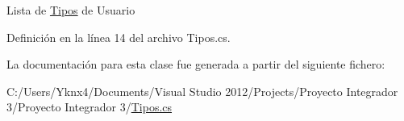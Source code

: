 Lista de \hyperlink{class_proyecto___integrador__3_1_1_tipos}{Tipos} de Usuario 



Definición en la línea 14 del archivo Tipos.\-cs.



La documentación para esta clase fue generada a partir del siguiente fichero\-:\begin{DoxyCompactItemize}
\item 
C\-:/\-Users/\-Yknx4/\-Documents/\-Visual Studio 2012/\-Projects/\-Proyecto Integrador 3/\-Proyecto Integrador 3/\hyperlink{_tipos_8cs}{Tipos.\-cs}\end{DoxyCompactItemize}
